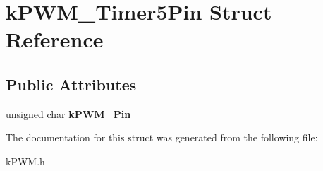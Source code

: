 \hypertarget{structkPWM__Timer5Pin}{}\section{k\+P\+W\+M\+\_\+\+Timer5\+Pin Struct Reference}
\label{structkPWM__Timer5Pin}
\subsection*{Public Attributes}
\begin{DoxyCompactItemize}
\item 
unsigned char {\bfseries k\+P\+W\+M\+\_\+\+Pin}\hypertarget{structkPWM__Timer5Pin_a1620a72e3e6ee5d140aa0d3267ca9807}{}\label{structkPWM__Timer5Pin_a1620a72e3e6ee5d140aa0d3267ca9807}

\end{DoxyCompactItemize}


The documentation for this struct was generated from the following file\+:\begin{DoxyCompactItemize}
\item 
k\+P\+W\+M.\+h\end{DoxyCompactItemize}
